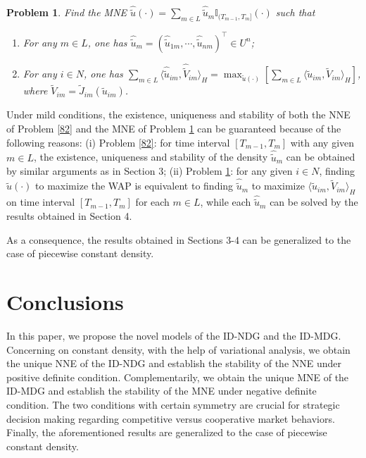 \documentclass[10pt]{article}
\newtheorem{prob}{Problem}[section]
\begin{document}
\begin{prob}\label{83}
Find the MNE   $\widehat{\widetilde{u}}(\cdot)=\sum_{m\in L}\widehat{\widetilde{u}}_m\mathbb{I}_{(T_{m-1},T_{m}]}(\cdot)$  such  that
\begin{enumerate}[($\romannumeral1$)]
  \item For any $m\in L$, one has $\widehat{\widetilde{u}}_m=(\widehat{\widetilde{u}}_{1m},\cdots,\widehat{\widetilde{u}}_{nm})^{\top}\in U^n$;
\item  For any $i\in N$, one has
$\sum_{m\in L}\langle \widehat{\widetilde{u}}_{im},\widehat{\widetilde{V}}_{im}\rangle_H=\max_{\widetilde{u}(\cdot)}[\sum_{m\in L}\langle\widetilde{u}_{im}, \widetilde{V}_{im}\rangle_{H}]$,
where $\widetilde{V}_{im}=\widetilde{J}_{im}(\widetilde{u}_{im})$.
\end{enumerate}
\end{prob}

Under mild conditions, the existence, uniqueness and stability of both the NNE of Problem \ref{82} and the MNE of Problem \ref{83} can be guaranteed because of the following reasons:
(i) Problem \ref{82}: for  time interval $[T_{m-1},T_{m}]$ with any given $m\in L$, the existence, uniqueness and stability of the density $\widehat{\widetilde{u}}_m$ can be obtained by similar arguments as in Section 3; (ii) Problem \ref{83}: for any given $i\in N$,   finding $\widehat{\widetilde{u}}(\cdot)$ to maximize the WAP  is equivalent to finding $\widehat{\widetilde{u}}_m$ to maximize $\langle\widetilde{u}_{im}, \widetilde{V}_{im}\rangle_{H}$ on time interval $[T_{m-1},T_{m}]$ for each $m\in L$, while each $\widehat{\widetilde{u}}_m$ can be solved by the results obtained in Section 4.

As a consequence, the results obtained in Sections 3-4 can be generalized to the case of piecewise  constant density.

\section{Conclusions}
In this paper, we propose the novel models of the ID-NDG and the ID-MDG. Concerning on constant density, with the help of variational analysis, we obtain the unique NNE of the ID-NDG and establish the stability of the NNE under positive definite condition. Complementarily,  we  obtain the unique MNE of the ID-MDG and establish the stability of the MNE under negative definite condition. The two  conditions with certain symmetry are crucial for strategic decision making regarding competitive versus cooperative market behaviors. Finally, the aforementioned results are generalized to the case of piecewise  constant density.
\end{document}
